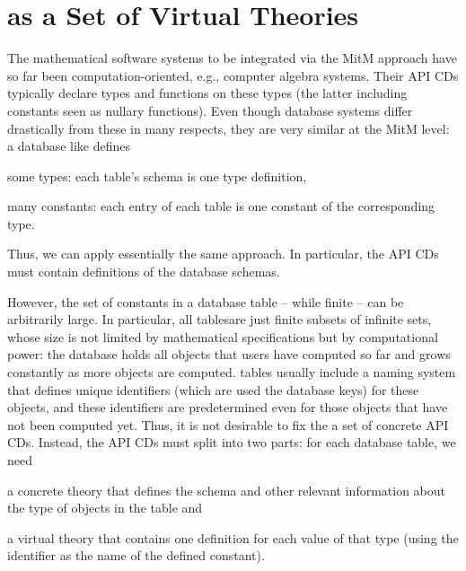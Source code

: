 \section{\lmfdb as a Set of Virtual Theories}\label{sec:vt}

The mathematical software systems to be integrated via the MitM approach have so far been computation-oriented, e.g., computer algebra systems.
Their API CDs typically declare types and functions on these types (the latter including constants seen as nullary functions).
Even though database systems differ drastically from these in many respects, they are very similar at the MitM level: a database like \lmfdb defines
\begin{compactitem}
 \item some types: each table's schema is one type definition,
 \item many constants: each entry of each table is one constant of the corresponding type.
\end{compactitem}
Thus, we can apply essentially the same approach.
In particular, the API CDs must contain definitions of the database schemas.

However, the set of constants in a database table -- while finite -- can be arbitrarily large.
In particular, all \lmfdb tables\footnotemark are just finite subsets of infinite sets, whose size is not limited by mathematical specifications but by computational power: the database holds all objects that users have computed so far and grows constantly as more objects are computed.
\lmfdb tables usually include a naming system that defines unique identifiers (which are used the database keys) for these objects, and these identifiers are predetermined even for those objects that have not been computed yet.
Thus, it is not desirable to fix the a set of concrete API CDs.
Instead, the API CDs must split into two parts: for each database table, we need
\begin{compactitem}
  \item a concrete theory that defines the schema and other relevant information about the type of objects in the table and
  \item a virtual theory that contains one definition for each value of that type (using the \lmfdb identifier as the name of the defined constant).
\end{compactitem}

